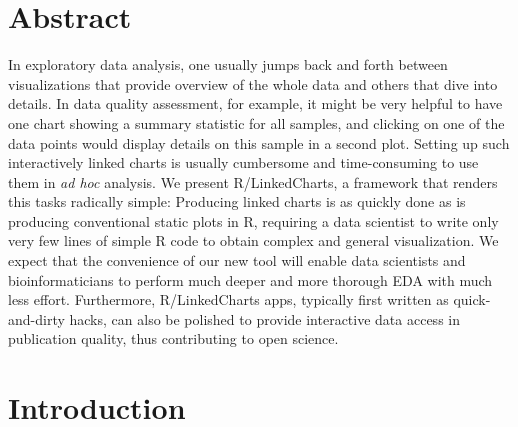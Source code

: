 \documentclass[twocolumn,10pt]{article}
\begin{document}
\setcounter{secnumdepth}{0}



\section{Abstract}
In exploratory data analysis, one usually jumps back and forth between visualizations that provide overview of the whole data and others that dive into details. In data quality assessment, for example, it might be very helpful to have one chart showing a summary statistic for all samples, and clicking on one of the data points would display details on this sample in a second plot. Setting up such interactively linked charts is usually cumbersome and time-consuming to use them in \emph{ad hoc} analysis. We present R/LinkedCharts, a framework  that renders this tasks radically simple: Producing linked charts is as quickly done as is producing conventional static plots in R, requiring a data scientist to write only very few lines of simple R code to obtain complex and general visualization. We expect that the convenience of our new tool will enable data scientists and bioinformaticians to perform much deeper and more thorough EDA with much less effort. Furthermore, R/LinkedCharts apps, typically first written as quick-and-dirty hacks, can also be polished to provide interactive data access in publication quality, thus contributing to open science.

\section{Introduction}
\end{document}
